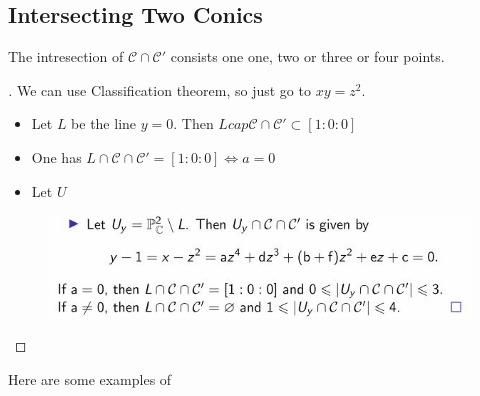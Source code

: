 \documentclass{article}
\begin{document}
\subsection{Intersecting Two Conics}

\begin{nthm}[]
  The intresection of $\mathcal{C} \cap \mathcal{C}'$ consists one one, two or three or four points.
\end{nthm}

\begin{proof}[]
  We can use Classification theorem, so just go to $xy = z^2$.
  \begin{itemize}
    \item Let $L$ be the line $y = 0$. Then $L cap \mathcal{C} \cap \mathcal{C}' \subset [1 : 0 : 0]$
    \item One has $L \cap \mathcal{C} \cap \mathcal{C}' = [1 : 0 : 0] \iff a = 0 $
    \item Let $U$
  \end{itemize}
  \begin{figure}[!ht]
  \centering
  \includegraphics{./figures/L2.4}
  \caption{}
  \end{figure}
\end{proof}

Here are some examples of
\end{document}
